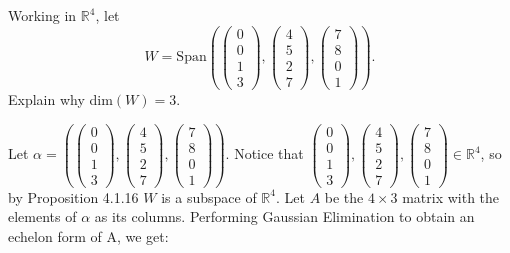 \documentclass[12pt]{article}
\newenvironment{problem}[2][Problem]
{
	\begin{trivlist} 
		\item[\hskip \labelsep {\bfseries #1 #2:}]
	}
{
	\end{trivlist}
	}
\newenvironment{solution}[1][Solution]
{
	\begin{trivlist} 
		\item[\hskip \labelsep {\itshape #1:}]
	}
	{
	\end{trivlist}
}
\begin{document}
\begin{problem}{1}
Working in $\mathbb{R}^4$, let
\[
W =\text{Span}\left( \begin{pmatrix} 0\\0\\1\\3 \end{pmatrix}, \begin{pmatrix} 4\\5\\2\\7 \end{pmatrix}, \begin{pmatrix} 7\\8\\0\\1 \end{pmatrix} \right) \text{.}
\]
Explain why dim$(W)=3$.
\noindent
\newline
\newline
\begin{solution}
Let $\alpha = \left( \begin{pmatrix} 0\\0\\1\\3 \end{pmatrix}, \begin{pmatrix} 4\\5\\2\\7 \end{pmatrix}, \begin{pmatrix} 7\\8\\0\\1 \end{pmatrix} \right)$. Notice that $\begin{pmatrix} 0\\0\\1\\3 \end{pmatrix}, \begin{pmatrix} 4\\5\\2\\7 \end{pmatrix}, \begin{pmatrix} 7\\8\\0\\1 \end{pmatrix} \in \mathbb{R}^4$, so by Proposition 4.1.16 $W$ is a subspace of $\mathbb{R}^4$. Let $A$ be the $4 \times 3$ matrix with the elements of $\alpha$ as its columns. Performing Gaussian Elimination to obtain an echelon form of A, we get:

\end{solution}
\end{problem}
\end{document}
